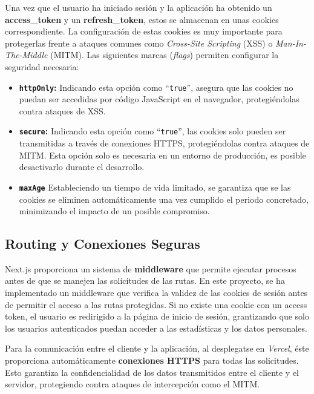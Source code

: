 Una vez que el usuario ha iniciado sesión y la aplicación ha obtenido un \textbf{access\_token} y un \textbf{refresh\_token}, estos se almacenan en unas cookies correspondiente. La configuración de estas cookies es muy importante para protegerlas frente a ataques comunes como \textit{Cross-Site Scripting} (XSS) o \textit{Man-In-The-Middle} (MITM). Las siguientes marcas (\textit{flags}) permiten configurar la seguridad necesaria:

\begin{itemize}
    \item \textbf{\texttt{httpOnly}:} Indicando esta opción como ``\texttt{true}'', asegura que las cookies no puedan ser accedidas por código JavaScript en el navegador, protegiéndolas contra ataques de XSS.
    \item \textbf{\texttt{secure}:} Indicando esta opción como ``\texttt{true}'', las cookies solo pueden ser transmitidas a través de conexiones HTTPS, protegiéndolas contra ataques de MITM. Esta opción solo es necesaria en un entorno de producción, es posible desactivarlo durante el desarrollo.
    \item \textbf{\texttt{maxAge}} Estableciendo un tiempo de vida limitado, se garantiza que se las cookies se eliminen automáticamente una vez cumplido el periodo concretado, minimizando el impacto de un posible compromiso.
\end{itemize}

\subsection{Routing y Conexiones Seguras}

Next.js proporciona un sistema de \textbf{middleware} que permite ejecutar procesos antes de que se manejen las solicitudes de las rutas. En este proyecto, se ha implementado un middleware que verifica la validez de las cookies de sesión antes de permitir el acceso a las rutas protegidas. Si no existe una cookie con un access token, el usuario es redirigido a la página de inicio de sesión, grantizando que solo los usuarios autenticados puedan acceder a las estadísticas y los datos personales.

Para la comunicación entre el cliente y la aplicación, al desplegatse en \textit{Vercel}, éste proporciona automáticamente \textbf{conexiones HTTPS} para todas las solicitudes. Esto garantiza la confidencialidad de los datos transmitidos entre el cliente y el servidor, protegiendo contra ataques de intercepción como el MITM.

